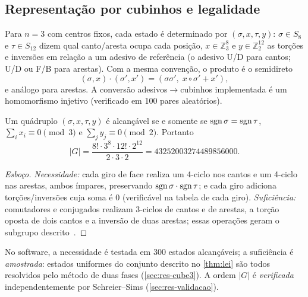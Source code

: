 \subsection{Representação por cubinhos e legalidade}
Para $n=3$ com centros fixos, cada estado é determinado por $(\sigma,x,\tau,y)$: $\sigma\in S_8$ e $\tau\in S_{12}$ dizem qual canto/aresta ocupa cada posição, $x\in\mathbb{Z}_3^8$ e $y\in\mathbb{Z}_2^{12}$ as torções e inversões em relação a um adesivo de referência (o adesivo U/D para cantos; U/D ou F/B para arestas). Com a mesma convenção, o produto é o semidireto
\begin{equation}
(\sigma,x)\cdot(\sigma',x')=(\sigma\sigma',\;x\circ\sigma'+x'),
\end{equation}
e análogo para arestas. A conversão adesivos$\to$cubinhos implementada é um homomorfismo injetivo (verificado em 100 pares aleatórios)\ver.

\begin{theorem}\label{thm:lei}\lit
Um quádruplo $(\sigma,x,\tau,y)$ é alcançável se e somente se $\operatorname{sgn}\sigma=\operatorname{sgn}\tau$, $\sum_i x_i\equiv0\pmod 3$ e $\sum_j y_j\equiv0\pmod 2$. Portanto
\begin{equation}
|G| = \frac{8!\cdot3^8\cdot12!\cdot2^{12}}{2\cdot3\cdot2} = \num{43252003274489856000}.
\end{equation}
\end{theorem}
\begin{proof}[Esboço]
\emph{Necessidade:} cada giro de face realiza um 4-ciclo nos cantos e um 4-ciclo nas arestas, ambos ímpares, preservando $\operatorname{sgn}\sigma\cdot\operatorname{sgn}\tau$; e cada giro adiciona torções/inversões cuja soma é $0$ (verificável na tabela de cada giro). \emph{Suficiência:} comutadores e conjugados realizam 3-ciclos de cantos e de arestas, a torção oposta de dois cantos e a inversão de duas arestas; essas operações geram o subgrupo descrito~\cite[cap.~11]{joyner2008}.
\end{proof}
\noindent No software, a necessidade é testada em 300 estados alcançáveis; a suficiência é \emph{amostrada}: estados uniformes do conjunto descrito no \cref{thm:lei} são todos resolvidos pelo método de duas fases (\cref{sec:res-cube3}). A ordem $|G|$ é \emph{verificada} independentemente por Schreier--Sims\ver{} (\cref{sec:res-validacao}).

